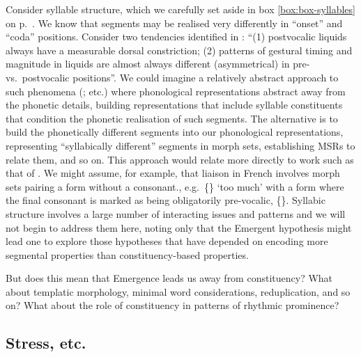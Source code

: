 Consider syllable structure, which we carefully set aside in box  {\ref{box:box-syllables}} on p.\ \pageref{box:box-syllables}. We know that segments may be realised very differently in ``onset'' and ``coda'' positions. Consider two tendencies identified in \citet[69]{Gick+:2006l}: ``(1) postvocalic liquids always have a measurable dorsal constriction; (2) patterns of gestural timing and magnitude in liquids are almost always different (asymmetrical) in pre- vs.\ postvocalic positions''. We could imagine a relatively abstract approach to such phenomena (\citealt{Kahn:1980, Clements+:1983, Levin:1985}; etc.) where phonological representations abstract away from the phonetic details, building representations that include syllable constituents that condition the phonetic realisation of such segments. The alternative is to build the phonetically different segments into our phonological representations, representing ``syllabically different'' segments in morph sets, establishing MSRs to relate them, and so on. This approach would relate more directly to work such as that of \citet{Steriade:1999syllabic}. We might assume, for example, that liaison in French involves morph sets pairing a form without a consonant., e.g.\ \{\} `too much' with a form where the final consonant is marked as being obligatorily pre-vocalic, \{\}. Syllabic structure involves a large number of interacting issues and patterns and we will not begin to address them here, noting only that the Emergent hypothesis might lead one to explore those hypotheses that have depended on encoding more segmental properties than constituency-based properties.

But does this mean that Emergence leads us away from constituency? What about templatic morphology, minimal word considerations, reduplication, and so on? What about the role of constituency in patterns of rhythmic prominence?

\subsection{Stress, etc.}

